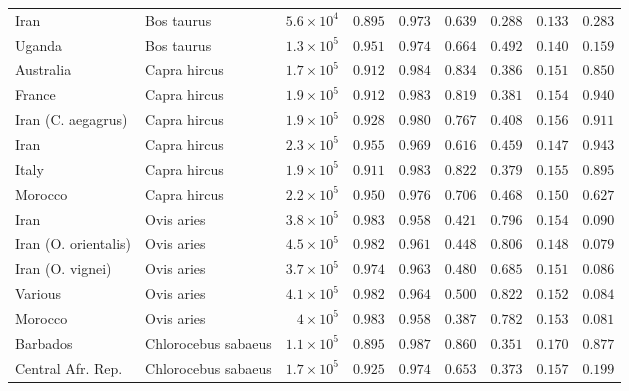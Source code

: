 \documentclass{article}
\begin{document}
\begin{center}
\begin{adjustbox}{width=\textwidth}
\begin{tabular}{||l|l|r||r|r||r|r||r|r||}
                Iran & Bos taurus & $5.6\times 10^{4}$ & $ 0.895$ & $ 0.973$ & $ 0.639$ & $ 0.288$ & $ 0.133$ & $ 0.283$ \\
                Uganda & Bos taurus & $1.3\times 10^{5}$ & $ 0.951$ & $ 0.974$ & $ 0.664$ & $ 0.492$ & $ 0.140$ & $ 0.159$ \\
                \rowcolor{LIGHTGREY} Australia & Capra hircus & $1.7\times 10^{5}$ & $ 0.912$ & $ 0.984$ & $ 0.834$ & $ 0.386$ & $ 0.151$ & $ 0.850$ \\
                \rowcolor{LIGHTGREY} France & Capra hircus & $1.9\times 10^{5}$ & $ 0.912$ & $ 0.983$ & $ 0.819$ & $ 0.381$ & $ 0.154$ & $ 0.940$ \\
                \rowcolor{LIGHTGREY} Iran (C. aegagrus) & Capra hircus & $1.9\times 10^{5}$ & $ 0.928$ & $ 0.980$ & $ 0.767$ & $ 0.408$ & $ 0.156$ & $ 0.911$ \\
                \rowcolor{LIGHTGREY} Iran & Capra hircus & $2.3\times 10^{5}$ & $ 0.955$ & $ 0.969$ & $ 0.616$ & $ 0.459$ & $ 0.147$ & $ 0.943$ \\
                \rowcolor{LIGHTGREY} Italy & Capra hircus & $1.9\times 10^{5}$ & $ 0.911$ & $ 0.983$ & $ 0.822$ & $ 0.379$ & $ 0.155$ & $ 0.895$ \\
                \rowcolor{LIGHTGREY} Morocco & Capra hircus & $2.2\times 10^{5}$ & $ 0.950$ & $ 0.976$ & $ 0.706$ & $ 0.468$ & $ 0.150$ & $ 0.627$ \\
                Iran & Ovis aries & $3.8\times 10^{5}$ & $ 0.983$ & $ 0.958$ & $ 0.421$ & $ 0.796$ & $ 0.154$ & $ 0.090$ \\
                Iran (O. orientalis) & Ovis aries & $4.5\times 10^{5}$ & $ 0.982$ & $ 0.961$ & $ 0.448$ & $ 0.806$ & $ 0.148$ & $ 0.079$ \\
                Iran (O. vignei) & Ovis aries & $3.7\times 10^{5}$ & $ 0.974$ & $ 0.963$ & $ 0.480$ & $ 0.685$ & $ 0.151$ & $ 0.086$ \\
                Various & Ovis aries & $4.1\times 10^{5}$ & $ 0.982$ & $ 0.964$ & $ 0.500$ & $ 0.822$ & $ 0.152$ & $ 0.084$ \\
                Morocco & Ovis aries & $ 4\times 10^{5}$ & $ 0.983$ & $ 0.958$ & $ 0.387$ & $ 0.782$ & $ 0.153$ & $ 0.081$ \\
                \rowcolor{LIGHTGREY} Barbados & Chlorocebus sabaeus & $1.1\times 10^{5}$ & $ 0.895$ & $ 0.987$ & $ 0.860$ & $ 0.351$ & $ 0.170$ & $ 0.877$ \\
                \rowcolor{LIGHTGREY} Central Afr. Rep. & Chlorocebus sabaeus & $1.7\times 10^{5}$ & $ 0.925$ & $ 0.974$ & $ 0.653$ & $ 0.373$ & $ 0.157$ & $ 0.199$ \\

\end{tabular}
\end{adjustbox}
\end{center}
\end{document}
